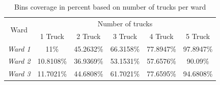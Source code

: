 \documentclass[12pt]{article}
\begin{document}
\begin{table}[H]
    \centering
    \caption{ Bins coverage in percent based on number of trucks per ward} \label{tab4}
    \vspace*{0.3cm}
    \begin{tabular}{|c|c|c|c|c|c|}
        \hline \multirow{2}{*}{Ward} & \multicolumn{5}{c|}{Number of trucks}\\
        \cline{2-6}& 1 Truck& 2 Truck& 3 Truck& 4 Truck& 5 Truck\\
        \hline \textit{Ward 1} & 11\%& 45.2632\%& 66.3158\%& 77.8947\%& 97.8947\%\\
        \hline \textit{Ward 2} &10.8108\%&36.9369\%&53.1531\%&57.6576\%&90.09\%\\
        \hline \textit{Ward 3} &11.7021\%&44.6808\%&61.7021\%&77.6595\%&94.6808\%\\
        \hline
    \end{tabular}
\end{table}
\end{document}
